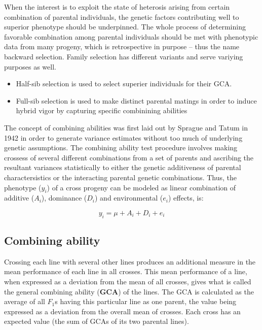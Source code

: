 \documentclass[nofonts,]{tufte-handout}
\providecommand{\tightlist}{%
  \setlength{\itemsep}{0pt}\setlength{\parskip}{0pt}}
\begin{document}
When the interest is to exploit the state of heterosis arising from
certain combination of parental individuals, the genetic factors
contributing well to superior phenotype should be underpinned. The whole
process of determining favorable combination among parental individuals
should be met with phenotypic data from many progeny, which is
retrospective in purpose -- thus the name backward selection. Family
selection has different variants and serve variying purposes as well.

\begin{itemize}
\tightlist
\item
  Half-sib selection is used to select superier individuals for their
  GCA.
\item
  Full-sib selection is used to make distinct parental matings in order
  to induce hybrid vigor by capturing specific combinining abilities
\end{itemize}

The concept of combining abilities was first laid out by Sprague and
Tatum in 1942 \citep{sprague1942general} in order to generate variance
estimates without too much of underlying genetic assumptions. The
combining ability test procedure involves making crossess of several
different combinations from a set of parents and ascribing the resultant
variances statistically to either the genetic additiveness of parental
charactersistics or the interacting parental genetic combinations. Thus,
the phenotype (\(y_i\)) of a cross progeny can be modeled as linear
combination of additive (\(A_i\)), dominance (\(D_i\)) and environmental
(\(e_i\)) effects, is:

\[y_i = \mu + A_i + D_i + e_i\]

\hypertarget{combining-ability}{%
\subsection{Combining ability}\label{combining-ability}}

Crossing each line with several other lines produces an additional
measure in the mean performance of each line in all crosses. This mean
performance of a line, when expressed as a deviation from the mean of
all crosses, gives what is called the general combining ability
(\textbf{GCA}) of the lines. The GCA is calculated as the average of all
\(F_1\)s having this particular line as one parent, the value being
expressed as a deviation from the overall mean of crosses. Each cross
has an expected value (the sum of GCAs of its two parental lines).
\end{document}
